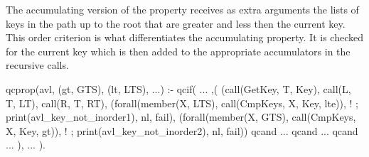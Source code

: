 The accumulating version of the property receives as extra arguments the
lists of keys in the path up to the root that are greater and less then
the current key.
%
This order criterion is what differentiates the accumulating property.
%
It is checked for the current key which is then added to the appropriate
accumulators in the recursive calls.
\begin{yapcode}
 qcprop({avl, (gt, GTS), (lt, LTS), ...}) :-
   qcif(
     ...
   ,(
     (call(GetKey, T, Key), call(L, T, LT),
      call(R, T, RT),
      (forall(member(X, LTS),
       call(CmpKeys, X, Key, lte)), !
      ; print(avl_key_not_inorder1), nl, fail),
      (forall(member(X, GTS),
       call(CmpKeys, X, Key, gt)), !
      ; print(avl_key_not_inorder2), nl, fail))
   qcand
     ...
   qcand
     ...
   qcand
     ...
   ),
     ...
   ).
\end{yapcode}




\begin{yapcode}
\end{yapcode}
\begin{yapcode}
\end{yapcode}
